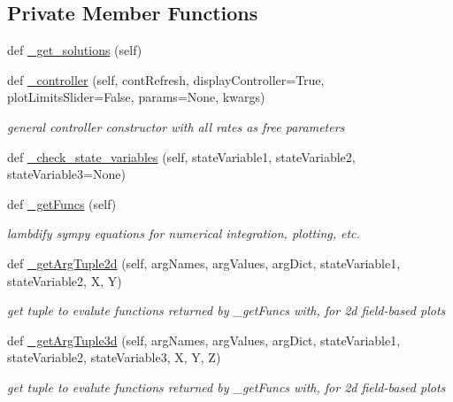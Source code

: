 \subsection*{Private Member Functions}
\begin{DoxyCompactItemize}
\item 
def \hyperlink{class_mu_mo_t_1_1_mu_mo_t_1_1_mu_mo_tmodel_ac8f6319b8c81e7c48d1f892603bcd307}{\+\_\+get\+\_\+solutions} (self)
\item 
def \hyperlink{class_mu_mo_t_1_1_mu_mo_t_1_1_mu_mo_tmodel_a4b8c84d4acb2f972908c67cd8dcf2a8e}{\+\_\+controller} (self, cont\+Refresh, display\+Controller=True, plot\+Limits\+Slider=False, params=None, kwargs)
\begin{DoxyCompactList}\small\item\em general controller constructor with all rates as free parameters \end{DoxyCompactList}\item 
def \hyperlink{class_mu_mo_t_1_1_mu_mo_t_1_1_mu_mo_tmodel_abef2b7019d8de30c16d7ade84ad45e09}{\+\_\+check\+\_\+state\+\_\+variables} (self, state\+Variable1, state\+Variable2, state\+Variable3=None)
\item 
def \hyperlink{class_mu_mo_t_1_1_mu_mo_t_1_1_mu_mo_tmodel_aa69fe5568e12577be5a63232d689e45e}{\+\_\+get\+Funcs} (self)
\begin{DoxyCompactList}\small\item\em lambdify sympy equations for numerical integration, plotting, etc. \end{DoxyCompactList}\item 
def \hyperlink{class_mu_mo_t_1_1_mu_mo_t_1_1_mu_mo_tmodel_a0965e5e61aa8f0d4e399e3b534d31a4c}{\+\_\+get\+Arg\+Tuple2d} (self, arg\+Names, arg\+Values, arg\+Dict, state\+Variable1, state\+Variable2, X, Y)
\begin{DoxyCompactList}\small\item\em get tuple to evalute functions returned by \+\_\+get\+Funcs with, for 2d field-\/based plots \end{DoxyCompactList}\item 
def \hyperlink{class_mu_mo_t_1_1_mu_mo_t_1_1_mu_mo_tmodel_a4a81885dd0451b6af31285c234b61d2a}{\+\_\+get\+Arg\+Tuple3d} (self, arg\+Names, arg\+Values, arg\+Dict, state\+Variable1, state\+Variable2, state\+Variable3, X, Y, Z)
\begin{DoxyCompactList}\small\item\em get tuple to evalute functions returned by \+\_\+get\+Funcs with, for 2d field-\/based plots \end{DoxyCompactList}\item 

\end{DoxyCompactItemize}
